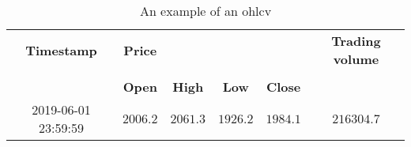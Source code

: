 \begin{table}[ht]
    \centering
    \begin{tabular}{ c c c c c c }
        \hline
        \textbf{Timestamp} & \textbf{Price} & & & & \textbf{Trading volume} \\
        \cline{2-5}\\
                  & \textbf{Open}  & \textbf{High} & \textbf{Low} & \textbf{Close} & \\
        \hline
        2019-06-01 23:59:59 & $2006.2$ &  $2061.3$ & $1926.2$ & $1984.1$ & $216304.7$\\
        \hline
    \end{tabular}
    \caption{An example of an \ac{ohlcv}}
    \label{tab:ohlcv}
\end{table}

